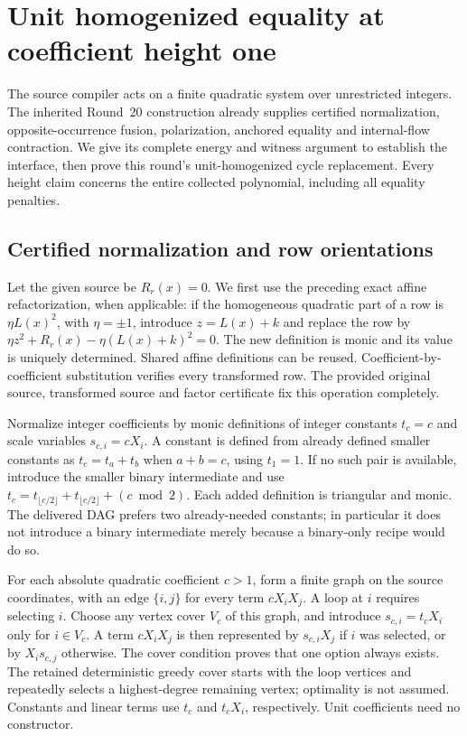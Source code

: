 \section{Unit homogenized equality at coefficient height one}
\label{sec:signed-network}
The source compiler acts on a finite quadratic system over unrestricted
integers. The inherited Round~20 construction already supplies certified
normalization, opposite-occurrence fusion, polarization, anchored equality
and internal-flow contraction. We give its complete energy and witness
argument to establish the interface, then prove this round's unit-homogenized
cycle replacement. Every height claim concerns the entire collected
polynomial, including all equality penalties.

\subsection{Certified normalization and row orientations}
Let the given source be $R_r(x)=0$. We first use the preceding exact affine
refactorization, when applicable: if the homogeneous quadratic part of a
row is $\eta L(x)^2$, with $\eta=\pm1$, introduce $z=L(x)+k$ and replace
the row by $\eta z^2+R_r(x)-\eta(L(x)+k)^2=0$. The new definition is monic
and its value is uniquely determined. Shared affine definitions can be
reused. Coefficient-by-coefficient substitution verifies every transformed
row. The provided original source, transformed source and factor
certificate fix this operation completely.

Normalize integer coefficients by monic definitions of integer constants
$t_c=c$ and scale variables $s_{c,i}=cX_i$. A constant is defined from
already defined smaller constants as $t_c=t_a+t_b$ when $a+b=c$, using
$t_1=1$. If no such pair is available, introduce the smaller binary
intermediate and use
$t_c=t_{\lfloor c/2\rfloor}+t_{\lfloor c/2\rfloor}+(c\bmod2)$.
Each added definition is triangular and monic. The delivered DAG prefers
two already-needed constants; in particular it does not introduce a
binary intermediate merely because a binary-only recipe would do so.

For each absolute quadratic coefficient $c>1$, form a finite graph on the
source coordinates, with an edge $\{i,j\}$ for every term $cX_iX_j$.
A loop at $i$ requires selecting $i$. Choose any vertex cover $V_c$ of
this graph, and introduce $s_{c,i}=t_cX_i$ only for $i\in V_c$. A term
$cX_iX_j$ is then represented by $s_{c,i}X_j$ if $i$ was selected, or by
$X_is_{c,j}$ otherwise. The cover condition proves that one option always
exists. The retained deterministic greedy cover starts with the loop
vertices and repeatedly selects a highest-degree remaining vertex;
optimality is not assumed. Constants and linear terms use $t_c$ and
$t_cX_i$, respectively. Unit coefficients need no constructor.

